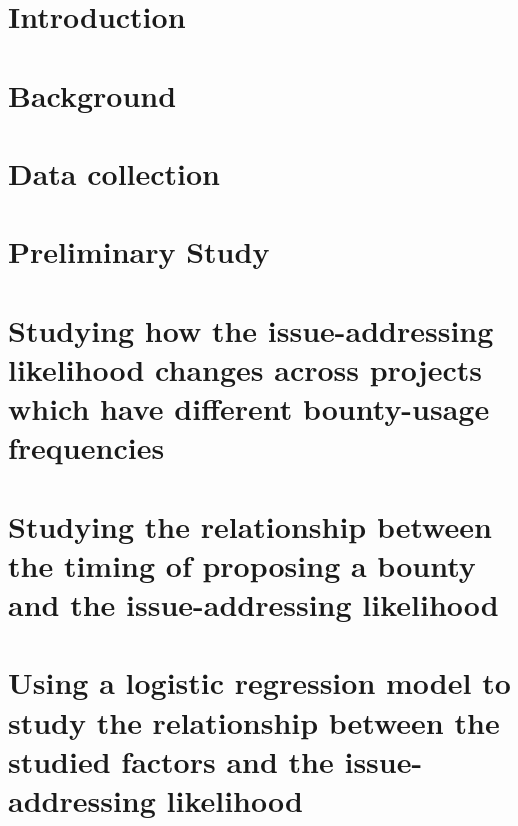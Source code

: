 \documentclass[10pt,journal,compsoc]{IEEEtran}
\begin{document}


\section{Introduction}\label{sec:introduction}


\section{Background}
\label{background}


\section{Data collection}
%
\label{dataset}


\section{Preliminary Study}
\label{prestudy}



\section{Studying how the issue-addressing likelihood changes across projects which have different bounty-usage frequencies}

\label{rq1}



\section{Studying the relationship between the timing of proposing a bounty and the issue-addressing likelihood}
\label{rq2}



\section{Using a logistic regression model to study the relationship between the studied factors and the issue-addressing likelihood}
\end{document}
